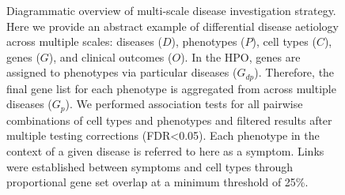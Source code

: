 \documentclass[
]{article}
\begin{document}
\begin{figure}


\caption{\label{fig-diagram}Diagrammatic overview of multi-scale disease
investigation strategy. Here we provide an abstract example of
differential disease aetiology across multiple scales: diseases (\(D\)),
phenotypes (\(P\)), cell types (\(C\)), genes (\(G\)), and clinical
outcomes (\(O\)). In the HPO, genes are assigned to phenotypes via
particular diseases (\(G_{dp}\)). Therefore, the final gene list for
each phenotype is aggregated from across multiple diseases (\(G_{p}\)).
We performed association tests for all pairwise combinations of cell
types and phenotypes and filtered results after multiple testing
corrections (FDR\textless0.05). Each phenotype in the context of a given
disease is referred to here as a symptom. Links were established between
symptoms and cell types through proportional gene set overlap at a
minimum threshold of 25\%.}

\end{figure}%

\newpage{}
\end{document}
